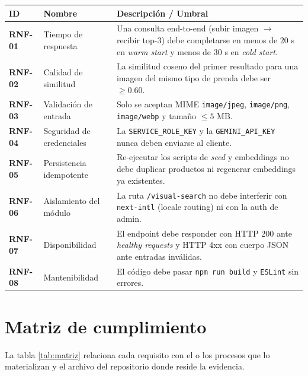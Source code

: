 \documentclass[11pt,letterpaper]{article}
\newcommand{\req}[1]{\textbf{#1}}
\begin{document}
\begin{longtable}{@{}l p{4.2cm} p{8cm}@{}}
\toprule
\textbf{ID} & \textbf{Nombre} & \textbf{Descripción / Umbral} \\
\midrule
\endhead
\req{RNF-01} & Tiempo de respuesta & Una consulta end-to-end (subir imagen $\rightarrow$ recibir top-3) debe completarse en menos de 20 s en \textit{warm start} y menos de 30 s en \textit{cold start}. \\
\req{RNF-02} & Calidad de similitud & La similitud coseno del primer resultado para una imagen del mismo tipo de prenda debe ser $\geq 0.60$. \\
\req{RNF-03} & Validación de entrada & Solo se aceptan MIME \texttt{image/jpeg}, \texttt{image/png}, \texttt{image/webp} y tamaño $\leq 5$ MB. \\
\req{RNF-04} & Seguridad de credenciales & La \texttt{SERVICE\_ROLE\_KEY} y la \texttt{GEMINI\_API\_KEY} nunca deben enviarse al cliente. \\
\req{RNF-05} & Persistencia idempotente & Re-ejecutar los scripts de \textit{seed} y embeddings no debe duplicar productos ni regenerar embeddings ya existentes. \\
\req{RNF-06} & Aislamiento del módulo & La ruta \texttt{/visual-search} no debe interferir con \texttt{next-intl} (locale routing) ni con la auth de admin. \\
\req{RNF-07} & Disponibilidad & El endpoint debe responder con HTTP 200 ante \textit{healthy requests} y HTTP 4xx con cuerpo JSON ante entradas inválidas. \\
\req{RNF-08} & Mantenibilidad & El código debe pasar \texttt{npm run build} y \texttt{ESLint} sin errores. \\
\bottomrule
\end{longtable}

\section{Matriz de cumplimiento}

La tabla \ref{tab:matriz} relaciona cada requisito con el o los procesos que lo materializan y el archivo del repositorio donde reside la evidencia.
\end{document}
